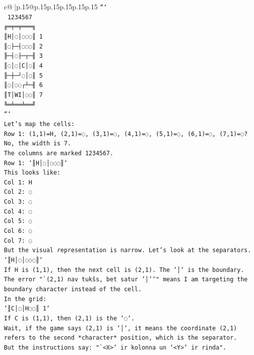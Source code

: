 \documentclass{article}
\begin{document}
{\begin{supertabular}{c@{$\;$}|p{.15\linewidth}@{}p{.15\linewidth}p{.15\linewidth}p{.15\linewidth}p{.15\linewidth}p{.15\linewidth}}
{{{\texttt{```} \\
\texttt{ 1234567} \\
\texttt{╔═╤═╤═══╗} \\
\texttt{║H│◌│◌◌◌║ 1} \\
\texttt{║◌├─┤◌◌◌║ 2} \\
\texttt{╟─┤◌├─┬─╢ 3} \\
\texttt{║◌│◌│C│◌║ 4} \\
\texttt{╟─┼─┘◌│◌║ 5} \\
\texttt{║◌│◌◌┌┴─╢ 6} \\
\texttt{║T│WI│◌◌║ 7} \\
\texttt{╚═╧══╧══╝} \\
\texttt{```} \\
\texttt{Let's map the cells:} \\
\texttt{Row 1: (1,1)=H, (2,1)=◌, (3,1)=◌, (4,1)=◌, (5,1)=◌, (6,1)=◌, (7,1)=◌? No, the width is 7.} \\
\texttt{The columns are marked 1234567.} \\
\texttt{Row 1: `║H│◌│◌◌◌║`} \\
\texttt{This looks like:} \\
\texttt{Col 1: H} \\
\texttt{Col 2: ◌} \\
\texttt{Col 3: ◌} \\
\texttt{Col 4: ◌} \\
\texttt{Col 5: ◌} \\
\texttt{Col 6: ◌} \\
\texttt{Col 7: ◌} \\
\texttt{But the visual representation is narrow. Let's look at the separators.} \\
\texttt{`║H│◌│◌◌◌║`} \\
\texttt{If H is (1,1), then the next cell is (2,1). The `│` is the boundary.} \\
\texttt{The error "`(2,1) nav tukšs, bet satur '│'`" means I am targeting the boundary character instead of the cell.} \\
\texttt{In the grid:} \\
\texttt{`║C│◌│H◌◌║ 1`} \\
\texttt{If C is (1,1), then (2,1) is the `◌`.} \\
\texttt{Wait, if the game says (2,1) is `│`, it means the coordinate (2,1) refers to the second *character* position, which is the separator.} \\
\texttt{But the instructions say: "`<X>` ir kolonna un `<Y>` ir rinda".} \\
}}}
\end{supertabular}}
\end{document}
